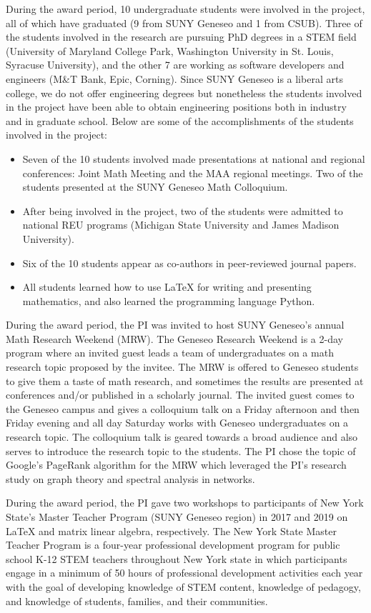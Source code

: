 \documentclass[11pt]{article}
\begin{document}
During the award period, 10 undergraduate students were involved in the project, all of which have graduated (9 from SUNY Geneseo and 1 from CSUB). Three of the students involved in the research are pursuing PhD degrees in a STEM field (University of Maryland College Park, Washington University in St. Louis, Syracuse University), and the other 7 are working as software developers and engineers (M\&T Bank, Epic, Corning).  Since SUNY Geneseo is a liberal arts college, we do not offer engineering degrees but nonetheless the students involved in the project have been able to obtain engineering positions both in industry and in graduate school.  Below are some of the accomplishments of the students involved in the project:
\begin{itemize}
\item Seven of the 10 students involved made presentations at national and regional conferences: Joint Math Meeting and the MAA regional meetings. Two of the students presented at the SUNY Geneseo Math Colloquium.
\item After being involved in the project, two of the students were admitted to national REU programs (Michigan State University and James Madison University).
\item Six of the 10 students appear as co-authors in peer-reviewed journal papers.
\item All students learned how to use LaTeX for writing and presenting mathematics, and also learned the programming language Python.
\end{itemize}


During the award period, the PI was invited to host SUNY Geneseo's annual Math Research Weekend (MRW). The Geneseo Research Weekend is a 2-day program where an invited guest leads a team of  undergraduates on a math research topic proposed by the invitee. The MRW is offered to Geneseo students to give them a taste of math research, and sometimes the results are presented at conferences and/or published in a scholarly journal. The invited guest comes to the Geneseo campus and gives a colloquium talk on a Friday afternoon and then Friday evening and all day Saturday works with Geneseo undergraduates on a research topic. The colloquium talk is geared towards a broad audience and also serves to introduce the research topic to the students. The PI chose the topic of Google's PageRank algorithm for the MRW which leveraged the PI's research study on graph theory and spectral analysis in networks.

During the award period, the PI gave two workshops to participants of New York State's Master Teacher Program (SUNY Geneseo region) in 2017 and 2019 on LaTeX and matrix linear algebra, respectively.  The New York State Master Teacher Program is a four-year professional development program for public school K-12 STEM teachers throughout New York state in which participants engage in a minimum of 50 hours of professional development activities each year with the goal of developing knowledge of STEM content, knowledge of pedagogy, and knowledge of students, families, and their communities.
\end{document}
